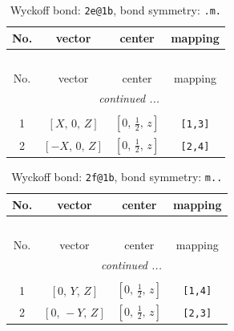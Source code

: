 \documentclass[fleqn,8pt]{jsarticle}
\begin{document}
\renewcommand{\arraystretch}{1.2}
\begin{longtable}{cccc}
\caption{Wyckoff bond: {\tt 2e@1b}, bond symmetry: {\tt .m.}}
 \\
 \hline \hline
No. & vector & center & mapping \\ \hline \endfirsthead

\multicolumn{3}{l}{\tablename\ \thetable{}} \\
 \hline \hline
No. & vector & center & mapping \\ \hline \endhead

 \hline \hline
\multicolumn{3}{r}{\footnotesize\it continued ...} \\ \endfoot

 \hline \hline
\multicolumn{3}{r}{} \\ \endlastfoot

1 & $\left[ X,\, 0,\, Z \right]$ & $\left[ 0,\, \frac{1}{2},\, z \right]$ & {\tt [1,3]} \\ \hline
2 & $\left[ - X,\, 0,\, Z \right]$ & $\left[ 0,\, \frac{1}{2},\, z \right]$ & {\tt [2,4]} \\
\end{longtable}
\renewcommand{\arraystretch}{1.2}
\begin{longtable}{cccc}
\caption{Wyckoff bond: {\tt 2f@1b}, bond symmetry: {\tt m..}}
 \\
 \hline \hline
No. & vector & center & mapping \\ \hline \endfirsthead

\multicolumn{3}{l}{\tablename\ \thetable{}} \\
 \hline \hline
No. & vector & center & mapping \\ \hline \endhead

 \hline \hline
\multicolumn{3}{r}{\footnotesize\it continued ...} \\ \endfoot

 \hline \hline
\multicolumn{3}{r}{} \\ \endlastfoot

1 & $\left[ 0,\, Y,\, Z \right]$ & $\left[ 0,\, \frac{1}{2},\, z \right]$ & {\tt [1,4]} \\ \hline
2 & $\left[ 0,\, - Y,\, Z \right]$ & $\left[ 0,\, \frac{1}{2},\, z \right]$ & {\tt [2,3]} \\
\end{longtable}
\renewcommand{\arraystretch}{1.2}
\end{document}
